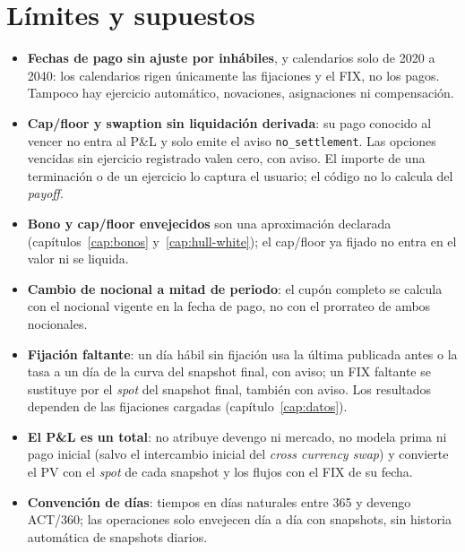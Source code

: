 \section{Límites y supuestos}\label{sec:cap08-limites}

\begin{limites}
  \begin{itemize}
    \item \textbf{Fechas de pago sin ajuste por inhábiles}, y calendarios solo de 2020 a 2040: los calendarios rigen únicamente las fijaciones y el FIX, no los pagos. Tampoco hay ejercicio automático, novaciones, asignaciones ni compensación.
    \item \textbf{Cap/floor y swaption sin liquidación derivada}: su pago conocido al vencer no entra al P\&L y solo emite el aviso \texttt{no\_settlement}. Las opciones vencidas sin ejercicio registrado valen cero, con aviso. El importe de una terminación o de un ejercicio lo captura el usuario; el código no lo calcula del \emph{payoff}.
    \item \textbf{Bono y cap/floor envejecidos} son una aproximación declarada (capítulos~\ref{cap:bonos} y~\ref{cap:hull-white}); el cap/floor ya fijado no entra en el valor ni se liquida.
    \item \textbf{Cambio de nocional a mitad de periodo}: el cupón completo se calcula con el nocional vigente en la fecha de pago, no con el prorrateo de ambos nocionales.
    \item \textbf{Fijación faltante}: un día hábil sin fijación usa la última publicada antes o la tasa a un día de la curva del snapshot final, con aviso; un FIX faltante se sustituye por el \emph{spot} del snapshot final, también con aviso. Los resultados dependen de las fijaciones cargadas (capítulo~\ref{cap:datos}).
    \item \textbf{El P\&L es un total}: no atribuye devengo ni mercado, no modela prima ni pago inicial (salvo el intercambio inicial del \emph{cross currency swap}) y convierte el PV con el \emph{spot} de cada snapshot y los flujos con el FIX de su fecha.
    \item \textbf{Convención de días}: tiempos en días naturales entre 365 y devengo ACT/360; las operaciones solo envejecen día a día con snapshots, sin historia automática de snapshots diarios.
  \end{itemize}
\end{limites}


